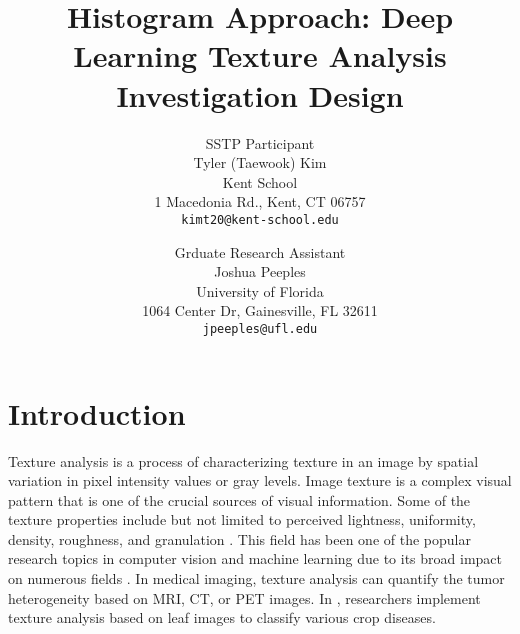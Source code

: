 \documentclass[10pt,twocolumn,letterpaper]{article}
\begin{document}

\title{
	Histogram Approach: Deep Learning Texture Analysis \\ 
	\large Investigation Design}


\author{SSTP Participant\\
Tyler (Taewook) Kim\\
Kent School\\
1 Macedonia Rd., Kent, CT 06757\\
{\tt\small kimt20@kent-school.edu} 
\and
Grduate Research Assistant\\
Joshua Peeples\\
University of Florida\\
1064 Center Dr, Gainesville, FL 32611\\
{\tt\small jpeeples@ufl.edu}
}

\maketitle



\section{Introduction}
 Texture analysis is a process of characterizing texture in an image by spatial variation in pixel intensity values or gray levels. Image texture is a complex visual pattern that is one of the crucial sources of visual information. Some of the texture properties include but not limited to perceived lightness, uniformity, density, roughness, and granulation \cite{Materka98textureanalysis}. This field has been one of the popular research topics in computer vision and machine learning due to its broad impact on numerous fields \cite{Cavalin2017methods}. In medical imaging, texture analysis can quantify the tumor heterogeneity based on MRI, CT, or PET images. \cite{Nalepa2014medical} In \cite{Pinto2016agri}, researchers implement texture analysis based on leaf images to classify various crop diseases.
\\
\end{document}
